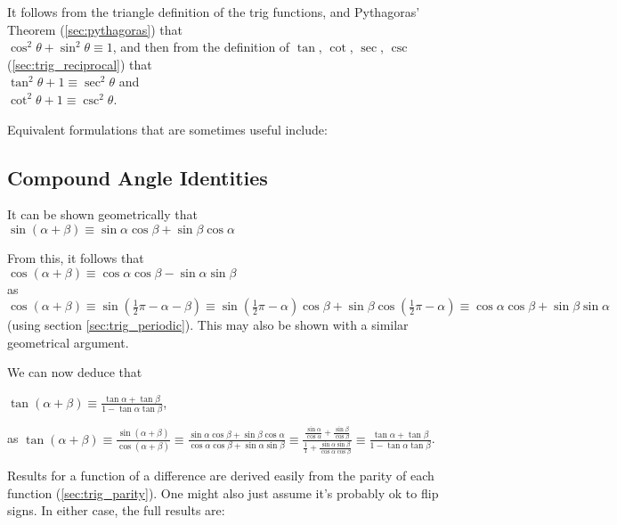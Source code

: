 \documentclass[a4paper,11pt]{article}
\begin{document}
    It follows from the triangle definition of the trig functions, and
    Pythagoras' Theorem (\ref{sec:pythagoras}) that
    \\$\cos^2 \theta + \sin^2 \theta \equiv 1$, and then from the definition of
    $\tan$, $\cot$, $\sec$, $\csc$ (\ref{sec:trig_reciprocal}) that
    \\$\tan^2 \theta + 1 \equiv \sec^2 \theta$ and
    \\$\cot^2 \theta + 1 \equiv \csc^2 \theta$.

    Equivalent formulations that are sometimes useful include:


    \subsection{Compound Angle Identities} \label{sec:comp_angle}


    It can be shown geometrically that
    \\$\sin(\alpha + \beta) \equiv
       \sin \alpha \cos \beta +  \sin \beta \cos \alpha$

    From this, it follows that
    \\$\cos(\alpha + \beta) \equiv
       \cos \alpha \cos \beta - \sin \alpha \sin \beta$
    \\as $\cos(\alpha + \beta) \equiv \sin(\frac 12 \pi - \alpha - \beta) \equiv
        \sin(\frac 12 \pi - \alpha)\cos \beta +
        \sin \beta \cos(\frac 12 \pi - \alpha) \equiv
        \cos \alpha \cos \beta + \sin \beta \sin \alpha$
    (using section \ref{sec:trig_periodic}). This may also be shown
    with a similar geometrical argument.

    We can now deduce that

    $\displaystyle \tan(\alpha + \beta) \equiv
        \frac{\tan \alpha + \tan \beta}{1 - \tan \alpha \tan \beta}$,

    as $\displaystyle\tan(\alpha + \beta) \equiv
        \frac{\sin(\alpha + \beta)}{\cos(\alpha + \beta)} \equiv
        \frac{\sin \alpha \cos \beta + \sin \beta \cos \alpha}
             {\cos \alpha \cos \beta + \sin \alpha \sin \beta} \equiv
        \frac{\frac{\sin \alpha}{\cos \alpha} + \frac{\sin \beta}{\cos \beta}}
             {\frac 11 + \frac{\sin \alpha \sin \beta}{\cos \alpha \cos \beta}}
             \equiv
        \frac{\tan \alpha + \tan \beta}{1 - \tan \alpha \tan \beta}$.

    Results for a function of a difference are derived easily from the parity of
    each function (\ref{sec:trig_parity}). One might also just assume it's
    probably ok to flip signs. In either case, the full results are:
\end{document}
